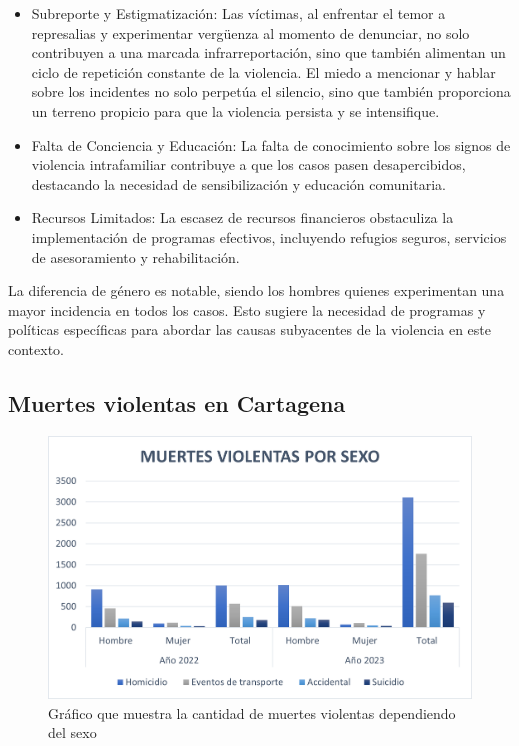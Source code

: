 \documentclass[letterpaper, 12pt]{article}
\begin{document}
\begin{itemize}[label=$\diamond$]
    \item Subreporte y Estigmatización: Las víctimas, al enfrentar el
          temor a represalias y experimentar vergüenza al momento de
          denunciar, no solo contribuyen a una marcada
          infrarreportación, sino que también alimentan un ciclo de
          repetición constante de la violencia. El miedo a mencionar
          y hablar sobre los incidentes no solo perpetúa el silencio,
          sino que también proporciona un terreno propicio para que
          la violencia persista y se intensifique.

    \item Falta de Conciencia y Educación: La falta de conocimiento
          sobre los signos de violencia intrafamiliar contribuye a
          que los casos pasen desapercibidos, destacando la necesidad
          de sensibilización y educación comunitaria.

    \item Recursos Limitados: La escasez de recursos financieros
          obstaculiza la implementación de programas efectivos,
          incluyendo refugios seguros, servicios de asesoramiento y
          rehabilitación.
\end{itemize}

La diferencia de género es notable, siendo los hombres
quienes experimentan una mayor incidencia en todos los
casos. Esto sugiere la necesidad de programas y políticas
específicas para abordar las causas subyacentes de la
violencia en este contexto.


\subsection*{Muertes violentas en Cartagena}

\begin{figure}[H]
    \begin{center}
        \includegraphics[width=.8\linewidth]{./Images/Graph.MuertesViolentas.png}
        \caption{Gráfico que muestra la cantidad de muertes violentas dependiendo del sexo}
        \label{fig:Graph.MuertesViolentas}
    \end{center}
\end{figure}
\end{document}
